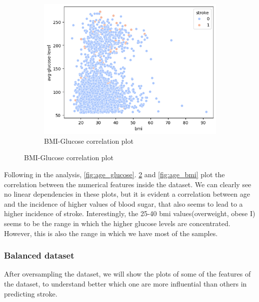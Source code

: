 \documentclass{Configuration_Files/Template}
\begin{document}
\begin{figure}[ht]
\begin{subfigure}[b]{\linewidth}
\centering
\includegraphics[scale=0.4]{Images/bmi-glucose_plot.png}
\caption{BMI-Glucose correlation plot}
\label{fig:bmi_glucose}
\end{subfigure}
\end{figure}

Following in the analysis, \ref{fig:age_glucose}. \ref{fig:bmi_glucose} and \ref{fig:age_bmi} plot the correlation between the numerical features inside the dataset. We can clearly see no linear dependencies in these plots, but it is evident a correlation between age and the incidence of higher values of blood sugar, that also seems to lead to a higher incidence of stroke. Interestingly, the 25-40 bmi values(overweight, obese I) seems to be the range in which the higher glucose levels are concentrated. However, this is also the range in which we have most of the samples.

\subsubsection{Balanced dataset}
After oversampling the dataset, we will show the plots of some of the features of the dataset, to understand better which one are more influential than others in predicting stroke.
\end{document}
